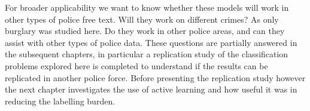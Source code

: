 For broader applicability we want to know whether these models will work in other types of police free text. Will they work on different crimes? As only burglary was studied here. Do they work in other police areas, and can they assist with other types of police data. These questions are partially answered in the subsequent chapters, in particular a replication study of the classification problems explored here is completed to understand if the results can be replicated in another police force. Before presenting the replication study however the next chapter investigates the use of active learning and how useful it was in reducing the labelling burden.

